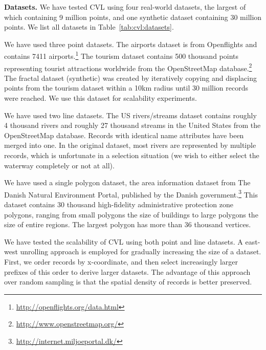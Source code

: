\documentclass[11pt, oneside]{report}
\newcommand{\minisec}[1]{\noindent\textbf{#1.}}
\begin{document}
\minisec{Datasets}
We have tested CVL using four real-world datasets, the largest of which containing 9 million points, and one synthetic dataset containing 30 million points. We list all datasets in Table~\ref{tab:cvl:datasets}. 

We have used three point datasets. The airports dataset is from Openflights and contains 7411 airports.\footnote{\url{http://openflights.org/data.html}} The tourism dataset contains 500 thousand points representing tourist attractions worldwide from the OpenStreetMap database.\footnote{\url{http://www.openstreetmap.org/}} The fractal dataset (synthetic) was created by iteratively copying and displacing points from the tourism dataset within a 10km radius until 30 million records were reached. We use this dataset for scalability experiments.

We have used two line datasets. The US rivers/streams dataset contains roughly 4 thousand rivers and roughly 27 thousand streams in the United States from the OpenStreetMap database. Records with identical name attributes have been merged into one. In the original dataset, most rivers are represented by multiple records, which is unfortunate in a selection situation (we wish to either select the waterway completely or not at all). 

We have used a single polygon dataset, the area information dataset from The Danish Natural Environment Portal, published by the Danish government.\footnote{\url{http://internet.miljoeportal.dk/}} This dataset contains 30 thousand high-fidelity administrative protection zone polygons, ranging from small polygons the size of buildings to large polygons the size of entire regions. The largest polygon has more than 36 thousand vertices.

We have tested the scalability of CVL using both point and line datasets. A east-west unrolling approach is employed for gradually increasing the size of a dataset. First, we order records by x-coordinate, and then select increasingly larger prefixes of this order to derive larger datasets. The advantage of this approach over random sampling is that the spatial density of records is better preserved.
\end{document}
